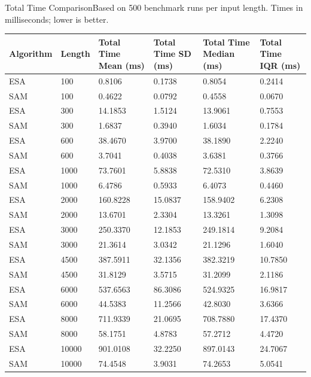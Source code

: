 \begin{benchmarktable}{Total Time Comparison}{Based on 500 benchmark runs per input length. Times in milliseconds; lower is better.}
\begin{tabularx}{\textwidth}{|X|X|X|X|X|X|}
\toprule
Algorithm & Length & Total Time Mean (ms) & Total Time SD (ms) & Total Time Median (ms) & Total Time IQR (ms) \\
\midrule
ESA & 100 & 0.8106 & 0.1738 & 0.8054 & 0.2414 \\
SAM & 100 & 0.4622 & 0.0792 & 0.4558 & 0.0670 \\
\hline
ESA & 300 & 14.1853 & 1.5124 & 13.9061 & 0.7553 \\
SAM & 300 & 1.6837 & 0.3940 & 1.6034 & 0.1784 \\
\hline
ESA & 600 & 38.4670 & 3.9700 & 38.1890 & 2.2240 \\
SAM & 600 & 3.7041 & 0.4038 & 3.6381 & 0.3766 \\
\hline
ESA & 1000 & 73.7601 & 5.8838 & 72.5310 & 3.8639 \\
SAM & 1000 & 6.4786 & 0.5933 & 6.4073 & 0.4460 \\
\hline
ESA & 2000 & 160.8228 & 15.0837 & 158.9402 & 6.2308 \\
SAM & 2000 & 13.6701 & 2.3304 & 13.3261 & 1.3098 \\
\hline
ESA & 3000 & 250.3370 & 12.1853 & 249.1814 & 9.2084 \\
SAM & 3000 & 21.3614 & 3.0342 & 21.1296 & 1.6040 \\
\hline
ESA & 4500 & 387.5911 & 32.1356 & 382.3219 & 10.7850 \\
SAM & 4500 & 31.8129 & 3.5715 & 31.2099 & 2.1186 \\
\hline
ESA & 6000 & 537.6563 & 86.3086 & 524.9325 & 16.9817 \\
SAM & 6000 & 44.5383 & 11.2566 & 42.8030 & 3.6366 \\
\hline
ESA & 8000 & 711.9339 & 21.0695 & 708.7880 & 17.4370 \\
SAM & 8000 & 58.1751 & 4.8783 & 57.2712 & 4.4720 \\
\hline
ESA & 10000 & 901.0108 & 32.2250 & 897.0143 & 24.7067 \\
SAM & 10000 & 74.4548 & 3.9031 & 74.2653 & 5.0541 \\
\bottomrule
\end{tabularx}
\end{benchmarktable}

